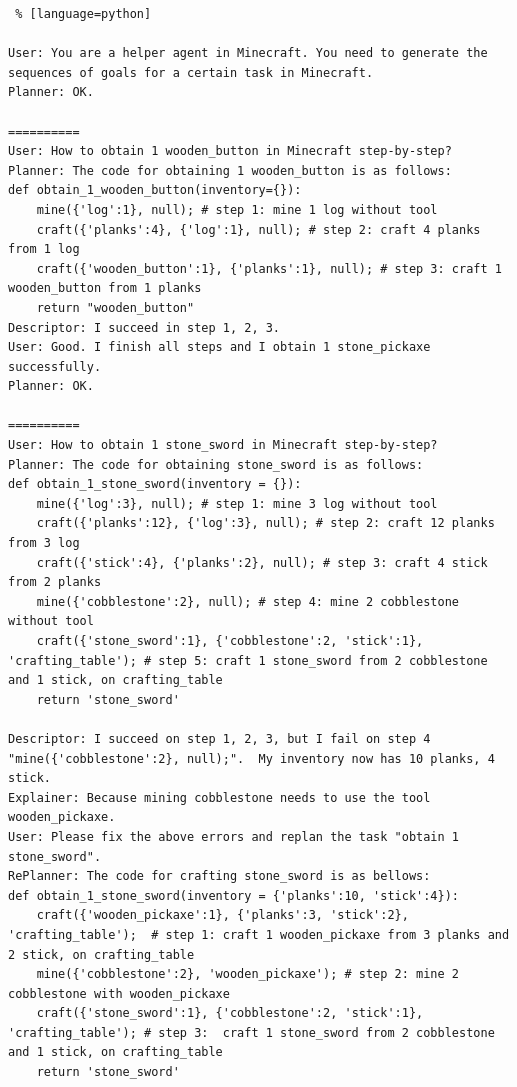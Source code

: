 \begin{lstlisting} % [language=python]  

User: You are a helper agent in Minecraft. You need to generate the sequences of goals for a certain task in Minecraft.
Planner: OK.

==========
User: How to obtain 1 wooden_button in Minecraft step-by-step?
Planner: The code for obtaining 1 wooden_button is as follows:
def obtain_1_wooden_button(inventory={}):
    mine({'log':1}, null); # step 1: mine 1 log without tool
    craft({'planks':4}, {'log':1}, null); # step 2: craft 4 planks from 1 log
    craft({'wooden_button':1}, {'planks':1}, null); # step 3: craft 1 wooden_button from 1 planks
    return "wooden_button"
Descriptor: I succeed in step 1, 2, 3. 
User: Good. I finish all steps and I obtain 1 stone_pickaxe successfully.
Planner: OK.

==========
User: How to obtain 1 stone_sword in Minecraft step-by-step?
Planner: The code for obtaining stone_sword is as follows:
def obtain_1_stone_sword(inventory = {}):
    mine({'log':3}, null); # step 1: mine 3 log without tool
    craft({'planks':12}, {'log':3}, null); # step 2: craft 12 planks from 3 log
    craft({'stick':4}, {'planks':2}, null); # step 3: craft 4 stick from 2 planks
    mine({'cobblestone':2}, null); # step 4: mine 2 cobblestone without tool
    craft({'stone_sword':1}, {'cobblestone':2, 'stick':1}, 'crafting_table'); # step 5: craft 1 stone_sword from 2 cobblestone and 1 stick, on crafting_table
    return 'stone_sword'

Descriptor: I succeed on step 1, 2, 3, but I fail on step 4 "mine({'cobblestone':2}, null);".  My inventory now has 10 planks, 4 stick.
Explainer: Because mining cobblestone needs to use the tool wooden_pickaxe.
User: Please fix the above errors and replan the task "obtain 1 stone_sword".
RePlanner: The code for crafting stone_sword is as bellows:
def obtain_1_stone_sword(inventory = {'planks':10, 'stick':4}):
    craft({'wooden_pickaxe':1}, {'planks':3, 'stick':2}, 'crafting_table');  # step 1: craft 1 wooden_pickaxe from 3 planks and 2 stick, on crafting_table
    mine({'cobblestone':2}, 'wooden_pickaxe'); # step 2: mine 2 cobblestone with wooden_pickaxe
    craft({'stone_sword':1}, {'cobblestone':2, 'stick':1}, 'crafting_table'); # step 3:  craft 1 stone_sword from 2 cobblestone and 1 stick, on crafting_table
    return 'stone_sword'
    

\end{lstlisting}
